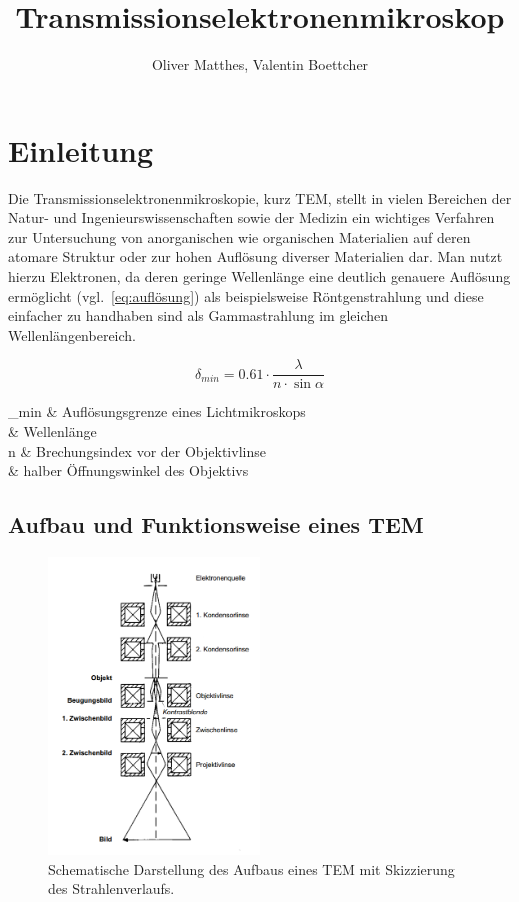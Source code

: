 \documentclass[slug=TEM, room=IFW, supervisor=?, coursedate=23.\ 01.\ 2020]{../../Lab_Report_LaTeX/lab_report}
\title{Transmissionselektronenmikroskop}
\author{Oliver Matthes, Valentin Boettcher}
\begin{document}
\maketitle

\section{Einleitung}
\label{sec:einl}

Die Transmissionselektronenmikroskopie, kurz TEM, stellt in vielen Bereichen der Natur- und
Ingenieurswissenschaften sowie der Medizin ein wichtiges Verfahren zur Untersuchung von
anorganischen wie organischen Materialien auf deren atomare Struktur oder zur hohen Auflösung
diverser Materialien dar. Man nutzt hierzu Elektronen, da deren geringe Wellenlänge eine
deutlich genauere Auflösung ermöglicht (vgl.~\ref{eq:auflösung}) als beispielsweise 
Röntgenstrahlung und diese einfacher zu handhaben sind als Gammastrahlung im gleichen 
Wellenlängenbereich.

\begin{equation}\label{eq:auflösung}
	\delta_{min} = 0.61 \cdot \frac{\lambda}{n \cdot \sin\alpha}
\end{equation}

\begin{conditions}
	\delta_{min} & Auflösungsgrenze eines Lichtmikroskops\\
	\lambda & Wellenlänge\\
	n & Brechungsindex vor der Objektivlinse\\
	\alpha & halber Öffnungswinkel des Objektivs
\end{conditions}

\subsection{Aufbau und Funktionsweise eines TEM}
\label{sec:aufbau}

\begin{figure}[h]
	\centering
	\includegraphics[width=0.5\textwidth]{../protokoll/figures/aufbau_tem.png}
	\caption{Schematische Darstellung des Aufbaus eines TEM mit Skizzierung des Strahlenverlaufs.}
	\label{fig:aufbau}
\end{figure}
\end{document}
